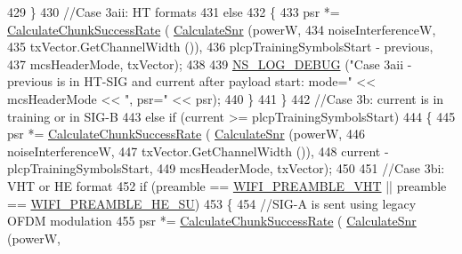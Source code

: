 \begin{DoxyCode}
429                 \}
430               \textcolor{comment}{//Case 3aii: HT formats}
431               \textcolor{keywordflow}{else}
432                 \{
433                   psr *= \hyperlink{classns3_1_1InterferenceHelper_ab1c34c3f7ecef1e37ec778c0cf0e9cef}{CalculateChunkSuccessRate} (
      \hyperlink{classns3_1_1InterferenceHelper_a8f6192d041874595004c007c5a519b4b}{CalculateSnr} (powerW,
434                                                                   noiseInterferenceW,
435                                                                   txVector.GetChannelWidth ()),
436                                                     plcpTrainingSymbolsStart - previous,
437                                                     mcsHeaderMode, txVector);
438 
439                   \hyperlink{group__logging_ga413f1886406d49f59a6a0a89b77b4d0a}{NS\_LOG\_DEBUG} (\textcolor{stringliteral}{"Case 3aii - previous is in HT-SIG and current after payload
       start: mode="} << mcsHeaderMode << \textcolor{stringliteral}{", psr="} << psr);
440                 \}
441             \}
442           \textcolor{comment}{//Case 3b: current is in training or in SIG-B}
443           \textcolor{keywordflow}{else} \textcolor{keywordflow}{if} (current >= plcpTrainingSymbolsStart)
444             \{
445               psr *= \hyperlink{classns3_1_1InterferenceHelper_ab1c34c3f7ecef1e37ec778c0cf0e9cef}{CalculateChunkSuccessRate} (
      \hyperlink{classns3_1_1InterferenceHelper_a8f6192d041874595004c007c5a519b4b}{CalculateSnr} (powerW,
446                                                               noiseInterferenceW,
447                                                               txVector.GetChannelWidth ()),
448                                                 current - plcpTrainingSymbolsStart,
449                                                 mcsHeaderMode, txVector);
450 
451               \textcolor{comment}{//Case 3bi: VHT or HE format}
452               \textcolor{keywordflow}{if} (preamble == \hyperlink{group__wifi_gga5e94a56cb338a14ffbbb19c6a41251ebab90b0fe0b17f27e51c0fe16239e7b089}{WIFI\_PREAMBLE\_VHT} || preamble == 
      \hyperlink{group__wifi_gga5e94a56cb338a14ffbbb19c6a41251eba99c3e12c6e91fc9a9bee491d20dab807}{WIFI\_PREAMBLE\_HE\_SU})
453                 \{
454                   \textcolor{comment}{//SIG-A is sent using legacy OFDM modulation}
455                   psr *= \hyperlink{classns3_1_1InterferenceHelper_ab1c34c3f7ecef1e37ec778c0cf0e9cef}{CalculateChunkSuccessRate} (
      \hyperlink{classns3_1_1InterferenceHelper_a8f6192d041874595004c007c5a519b4b}{CalculateSnr} (powerW,

\end{DoxyCode}
